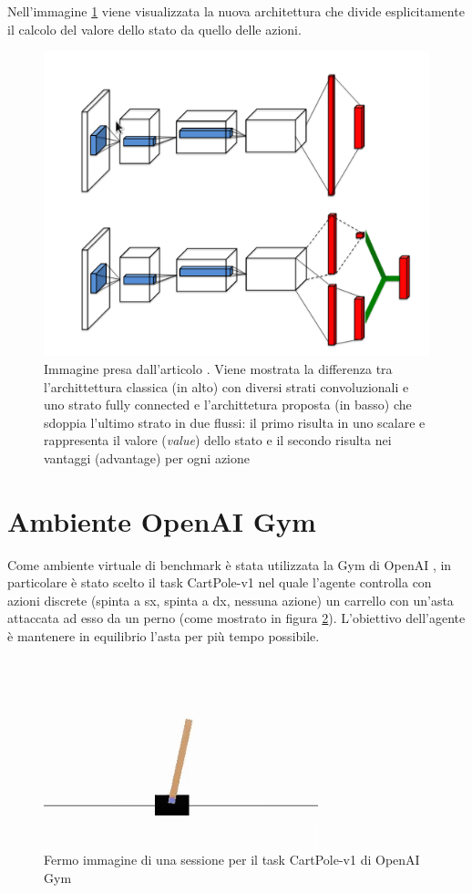 \documentclass{article}
\begin{document}
		Nell'immagine \ref{fig:dueling_arch} viene visualizzata la nuova architettura che divide esplicitamente il calcolo del valore dello stato da quello delle azioni.

		\begin{figure}[H]
			\centering
			\includegraphics[width=0.5\linewidth]{dueling_arch.png}
			\caption{Immagine presa dall'articolo \cite{1511.06581}. Viene mostrata la differenza tra l'archittettura classica (in alto) con diversi strati convoluzionali e uno strato fully connected e l'archittetura proposta (in basso) che sdoppia l'ultimo strato in due flussi: il primo risulta in uno scalare e rappresenta il valore (\textit{value}) dello stato e il secondo risulta nei vantaggi (advantage) per ogni azione}
			\label{fig:dueling_arch}
		\end{figure}

	\section{Ambiente OpenAI Gym}
		Come ambiente virtuale di benchmark è stata utilizzata la Gym di OpenAI \cite{open.ai}, in particolare è stato scelto il task CartPole-v1 nel quale l'agente controlla con azioni discrete (spinta a sx, spinta a dx, nessuna azione) un carrello con un'asta attaccata ad esso da un perno (come mostrato in figura \ref{fig:cartpole}). L'obiettivo dell'agente è mantenere in equilibrio l'asta per più tempo possibile.

		\begin{figure}[H]
			\centering
			\includegraphics[width=0.3\linewidth]{cartpole.png}
			\caption{Fermo immagine di una sessione per il task CartPole-v1 di OpenAI Gym}
			\label{fig:cartpole}
		\end{figure}
\end{document}
